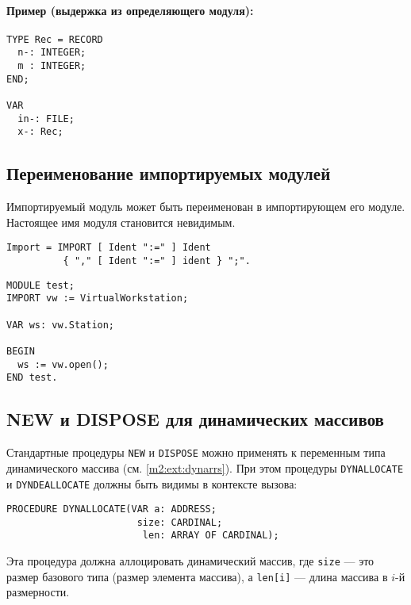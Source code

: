 \paragraph{Пример (выдержка из определяющего модуля):}
\begin{verbatim}
TYPE Rec = RECORD
  n-: INTEGER;
  m : INTEGER;
END;

VAR
  in-: FILE;
  x-: Rec;
\end{verbatim}

\subsection{Переименование импортируемых модулей}
\mextonly

Импортируемый модуль может быть переименован в импортирующем его модуле.
Настоящее имя модуля становится невидимым.
\begin{verbatim}
Import = IMPORT [ Ident ":=" ] Ident
          { "," [ Ident ":=" ] ident } ";".
\end{verbatim}

\Example
\begin{verbatim}
MODULE test;
IMPORT vw := VirtualWorkstation;

VAR ws: vw.Station;

BEGIN
  ws := vw.open();
END test.
\end{verbatim}

\subsection{NEW и DISPOSE для динамических массивов}\label{m2:ext:NEW}

Стандартные процедуры {\tt NEW} и {\tt DISPOSE} можно применять
к переменным типа динамического массива (см. \ref{m2:ext:dynarrs}).
При этом процедуры {\tt DYNALLOCATE} и {\tt DYNDEALLOCATE} должны быть
видимы в контексте вызова:

\begin{verbatim}
PROCEDURE DYNALLOCATE(VAR a: ADDRESS;
                       size: CARDINAL;
                        len: ARRAY OF CARDINAL);
\end{verbatim}

Эта процедура должна аллоцировать динамический массив, где
\verb|size| --- это размер базового типа (размер элемента массива),
а \verb|len[i]| --- длина массива в  $i$-й размерности.

